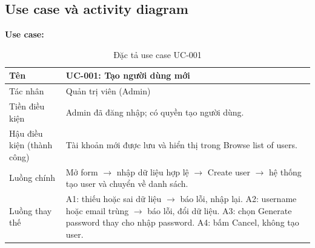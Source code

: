 \documentclass[12pt,a4paper]{article}
\begin{document}
\subsection{Use case và activity diagram}
\textbf{Use case:}
\begin{table}[H]
\centering\small
\begin{tabular}{|L{3.6cm}|L{11.4cm}|}
\hline
Tên & UC-001: Tạo người dùng mới \\ \hline
Tác nhân & Quản trị viên (Admin) \\ \hline
Tiền điều kiện & Admin đã đăng nhập; có quyền tạo người dùng. \\ \hline
Hậu điều kiện (thành công) & Tài khoản mới được lưu và hiển thị trong Browse list of users. \\ \hline
Luồng chính & Mở form $\rightarrow$ nhập dữ liệu hợp lệ $\rightarrow$ Create user $\rightarrow$ hệ thống tạo user và chuyển về danh sách. \\ \hline
Luồng thay thế & A1: thiếu hoặc sai dữ liệu $\rightarrow$ báo lỗi, nhập lại. A2: username hoặc email trùng $\rightarrow$ báo lỗi, đổi dữ liệu.
A3: chọn Generate password thay cho nhập password. A4: bấm Cancel, không tạo user. \\ \hline
\end{tabular}
\caption{Đặc tả use case UC-001}
\end{table}
\end{document}
